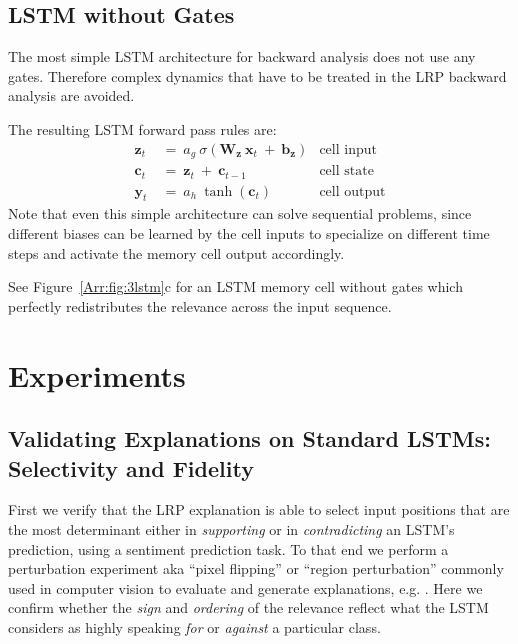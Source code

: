 \documentclass[runningheads]{llncs}
\newcommand\Bb{\bm{b}}%
\newcommand\Bc{\bm{c}}%
\newcommand\Bx{\bm{x}}%
\newcommand\By{\bm{y}}%
\newcommand\Bz{\bm{z}}%
\newcommand\BW{\bm{W}}%
\begin{document}
\subsection{LSTM without Gates}

The most simple LSTM architecture for backward analysis does not
use any gates. Therefore complex dynamics that have to be treated 
in the LRP backward analysis are avoided.

The resulting LSTM forward pass rules are:
\begin{align}
\Bz_t \ &= \ a_g \ \sigma \left( \BW_{\Bz} \ \Bx_t \ + \
   \Bb_{\Bz}\right) & \text{cell input} \\
\Bc_t \ &= \  \Bz_t \ + \ \Bc_{t-1} & \text{cell state} \\
\By_t \ &= \ a_h \ \tanh\left( \Bc_t \right) &
\text{cell output}
\end{align}
Note that even this simple architecture can solve sequential problems, since different biases can be learned by the cell inputs to specialize on different time steps and activate the memory cell output accordingly.

See Figure~\ref{Arr:fig:3lstm}c for an LSTM memory cell without
gates which perfectly redistributes the relevance across the input sequence.




\section{Experiments}
\label{Arr:sec:experiments}

\subsection{Validating Explanations on Standard LSTMs: Selectivity and Fidelity}
\label{Arr:sec:Experiments_with_standard_LSTMs}
\index{Evaluating Explanations}
First we verify that the LRP explanation is able to select input positions that are the most determinant either in {\it supporting} or in {\it contradicting} an LSTM's prediction, using a sentiment prediction task. 
To that end we perform a perturbation experiment aka ``pixel flipping'' or ``region perturbation'' \cite{Arr:Bach:15,Arr:Samek:TNNLS2017} commonly used in computer vision to evaluate and generate explanations, e.g. \cite{Arr:Lundberg:NIPS2017,Arr:Ancona:ICLR2018,Arr:Chen:ICML2018,Arr:Morcos:ICLR2018}.
Here we confirm whether the {\it sign} and {\it ordering} of the relevance reflect what the LSTM considers as highly speaking {\it for} or {\it against} a particular class.
\end{document}
